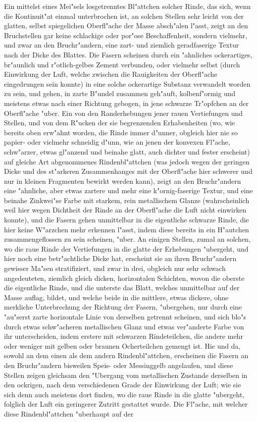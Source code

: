 \documentclass[a4paper, 11pt, oneside, german]{article}
\begin{document}
Ein mittelst eines Mei"sels losgetrenntes Bl"attchen solcher Rinde, das sich, wenn die Kontinuit"at einmal unterbrochen ist, an solchen Stellen sehr leicht von der glatten, selbst spiegelichen Oberfl"ache der Masse absch"alen l"asst, zeigt an den Bruchstellen gar keine schlackige oder por"ose Beschaffenheit, sondern vielmehr, und zwar an den Bruchr"andern, eine zart- und ziemlich geradfaserige Textur nach der Dicke des Blattes. Die Fasern scheinen durch ein "ahnliches ockerartiges, br"aunlich und r"otlich-gelbes Zement verbunden, oder vielmehr selbst (durch Einwirkung der Luft, welche zwischen die Rauigkeiten der Oberfl"ache eingedrungen sein konnte) in eine solche ockerartige Substanz verwandelt worden zu sein, und gehen, in zarte B"undel zusammen geh"auft, kolbenf"ormig und meistens etwas nach einer Richtung gebogen, in jene schwarze Tr"opfchen an der Oberfl"ache "uber. Ein von den Randerhebungen jener rauen Vertiefungen und Stellen, und von dem R"ucken der sie begrenzenden Erhabenheiten (wo, wie bereits oben erw"ahnt worden, die Rinde immer d"unner, obgleich hier nie so papier- oder vielmehr schneidig d"unn, wie an jenen der konvexen Fl"ache, schw"arzer, etwas gl"anzend und beinahe glatt, auch dichter und fester erscheint) auf gleiche Art abgenommenes Rindenbl"attchen (was jedoch wegen der geringen Dicke und des st"arkeren Zusammenhanges mit der Oberfl"ache hier schwerer und nur in kleinen Fragmenten bewirkt werden kann), zeigt an den Bruchr"andern eine "ahnliche, aber etwas zartere und mehr eine k"ornig-faserige Textur, und eine beinahe Zinkwei"se Farbe mit starkem, rein metallischem Glanze (wahrscheinlich weil hier wegen Dichtheit der Rinde an der Oberfl"ache die Luft nicht einwirken konnte), und die Fasern gehen unmittelbar in die eigentliche schwarze Rinde, die hier keine W"arzchen mehr erkennen l"asst, indem diese bereits in ein H"autchen zusammengeflossen zu sein scheinen, "uber. An einigen Stellen, zumal an solchen, wo die raue Rinde der Vertiefungen in die glatte der Erhebungen "ubergeht, und hier noch eine betr"achtliche Dicke hat, erscheint sie an ihren Bruchr"andern gewisser Ma"sen stratifiziert, und zwar in drei, obgleich nur sehr schwach angedeuteten, ziemlich gleich dicken, horizontalen Schichten, wovon die oberste die eigentliche Rinde, und die unterste das Blatt, welches unmittelbar auf der Masse auflag, bildet, und welche beide in die mittlere, etwas dickere, ohne merkliche Unterbrechung der Richtung der Fasern, "ubergehen, nur durch eine "au"serst zarte horizontale Linie von derselben getrennt scheinen, und sich blo"s durch etwas schw"acheren metallischen Glanz und etwas ver"anderte Farbe von ihr unterscheiden, indem erstere mit schwarzen Rindeteilchen, die andere mehr oder weniger mit gelben oder braunen Ocherteilchen gemengt ist. Hie und da, sowohl an dem einen als dem andern Rindenbl"attchen, erscheinen die Fasern an den Bruchr"andern bisweilen Speis- oder Messinggelb angelaufen, und diese Stellen zeigen gleichsam den "Ubergang vom metallischen Zustande derselben in den ockrigen, nach dem verschiedenen Grade der Einwirkung der Luft; wie sie sich denn auch meistens dort finden, wo die raue Rinde in die glatte "ubergeht, folglich der Luft ein geringerer Zutritt gestattet wurde. Die Fl"ache, mit welcher diese Rindenbl"attchen "uberhaupt auf der 
\end{document}
